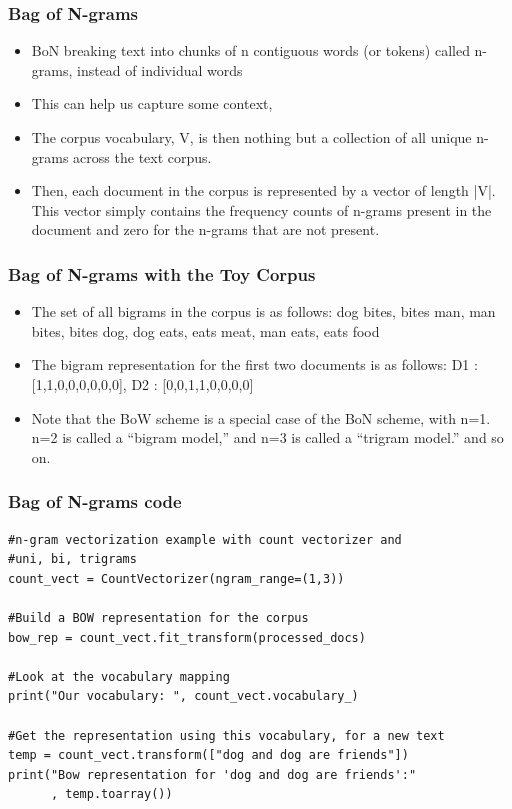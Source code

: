 \documentclass{beamer}
\begin{document}
\begin{frame}
\frametitle{Bag of N-grams}
\begin{itemize}
\item BoN breaking text into chunks of n contiguous words (or tokens) called n-grams, instead of individual words 
\item This can help us capture some context,  
\item The corpus vocabulary, V, is then nothing but a collection of all unique n-grams across the text corpus. 
\item Then, each document in the corpus is represented by a vector of length |V|. This vector simply contains the frequency counts of n-grams present in the document and zero for the n-grams that are not present.
\end{itemize}
\end{frame}

\begin{frame}
\frametitle{Bag of N-grams with the Toy Corpus}
\begin{itemize}
\item The set of all bigrams in the corpus is as follows: {dog bites, bites man, man bites, bites dog, dog eats, eats meat, man eats, eats food}
\item The bigram representation for the first two documents is as follows: D1 : [1,1,0,0,0,0,0,0], D2 : [0,0,1,1,0,0,0,0] \pause
\item Note that the BoW scheme is a special case of the BoN scheme, with n=1. n=2 is called a “bigram model,” and n=3 is called a “trigram model.” and so on. 
\end{itemize}
\end{frame}

\begin{frame}[fragile]
\frametitle{Bag of N-grams code}
\small
\begin{verbatim}
#n-gram vectorization example with count vectorizer and 
#uni, bi, trigrams
count_vect = CountVectorizer(ngram_range=(1,3))

#Build a BOW representation for the corpus
bow_rep = count_vect.fit_transform(processed_docs)

#Look at the vocabulary mapping
print("Our vocabulary: ", count_vect.vocabulary_)

#Get the representation using this vocabulary, for a new text
temp = count_vect.transform(["dog and dog are friends"])
print("Bow representation for 'dog and dog are friends':"
      , temp.toarray())

\end{verbatim}
\end{frame}
\end{document}
